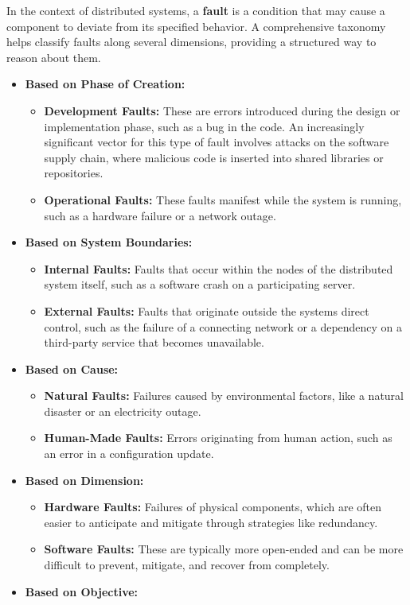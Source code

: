 \documentclass{scrbook}
\begin{document}
In the context of distributed systems, a \textbf{fault} is a condition
that may cause a component to deviate from its specified behavior. A
comprehensive taxonomy helps classify faults along several dimensions,
providing a structured way to reason about them.

\begin{itemize}
\item
  \textbf{Based on Phase of Creation:}

  \begin{itemize}
  \item
    \textbf{Development Faults:} These are errors introduced during the
    design or implementation phase, such as a bug in the code. An
    increasingly significant vector for this type of fault involves
    attacks on the software supply chain, where malicious code is
    inserted into shared libraries or repositories.
  \item
    \textbf{Operational Faults:} These faults manifest while the system
    is running, such as a hardware failure or a network outage.
  \end{itemize}
\item
  \textbf{Based on System Boundaries:}

  \begin{itemize}
  \item
    \textbf{Internal Faults:} Faults that occur within the nodes of the
    distributed system itself, such as a software crash on a
    participating server.
  \item
    \textbf{External Faults:} Faults that originate outside the
    system\textquotesingle s direct control, such as the failure of a
    connecting network or a dependency on a third-party service that
    becomes unavailable.
  \end{itemize}
\item
  \textbf{Based on Cause:}

  \begin{itemize}
  \item
    \textbf{Natural Faults:} Failures caused by environmental factors,
    like a natural disaster or an electricity outage.
  \item
    \textbf{Human-Made Faults:} Errors originating from human action,
    such as an error in a configuration update.
  \end{itemize}
\item
  \textbf{Based on Dimension:}

  \begin{itemize}
  \item
    \textbf{Hardware Faults:} Failures of physical components, which are
    often easier to anticipate and mitigate through strategies like
    redundancy.
  \item
    \textbf{Software Faults:} These are typically more open-ended and
    can be more difficult to prevent, mitigate, and recover from
    completely.
  \end{itemize}
\item
  \textbf{Based on Objective:}


\end{itemize}
\end{document}

